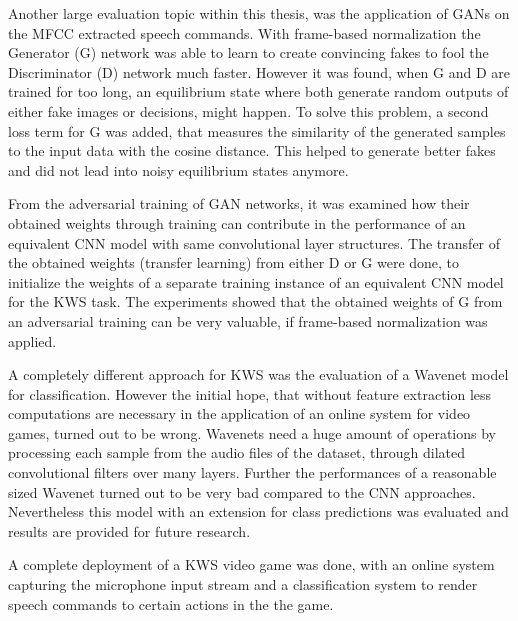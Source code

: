 Another large evaluation topic within this thesis, was the application of GANs on the MFCC extracted speech commands. 
With frame-based normalization the Generator (G) network was able to learn to create convincing fakes to fool the Discriminator (D) network much faster.
However it was found, when G and D are trained for too long, an equilibrium state where both generate random outputs of either fake images or decisions, might happen.
To solve this problem, a second loss term for G was added, that measures the similarity of the generated samples to the input data with the cosine distance.
This helped to generate better fakes and did not lead into noisy equilibrium states anymore.

From the adversarial training of GAN networks, it was examined how their obtained weights through training can contribute in the performance of an equivalent CNN model with same convolutional layer structures.
The transfer of the obtained weights (transfer learning) from either D or G were done, to initialize the weights of a separate training instance of an equivalent CNN model for the KWS task.
The experiments showed that the obtained weights of G from an adversarial training can be very valuable, if frame-based normalization was applied.

A completely different approach for KWS was the evaluation of a Wavenet \cite{Oord2016} model for classification.
However the initial hope, that without feature extraction less computations are necessary in the application of an online system for video games, turned out to be wrong.
Wavenets need a huge amount of operations by processing each sample from the audio files of the dataset, through dilated convolutional filters over many layers.
Further the performances of a reasonable sized Wavenet turned out to be very bad compared to the CNN approaches.
Nevertheless this model with an extension for class predictions was evaluated and results are provided for future research.

A complete deployment of a KWS video game was done, with an online system capturing the microphone input stream and a classification system to render speech commands to certain actions in the the game.